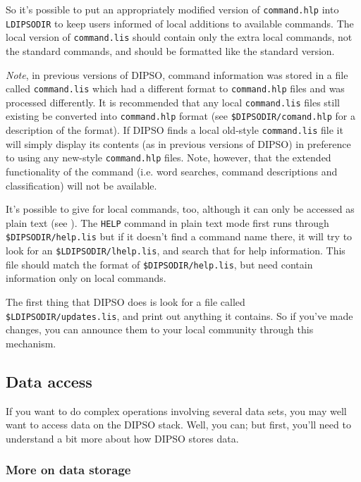 So it's possible to put an appropriately modified version of
{\tt{command.hlp}}  into {\tt{LDIPSODIR}}  to keep users informed of local
additions to available commands. The local version of {\tt{command.lis}} 
should contain only the extra local commands, not the standard commands,
and should be formatted like the standard version.

{\em Note}, in previous versions of DIPSO, command information was stored
in a file called {\tt{command.lis}}  which had a different format to
{\tt{command.hlp}}  files and was processed differently. It is recommended that
any local {\tt{command.lis}}  files still existing be converted into
{\tt{command.hlp}}  format (see {\tt{\$DIPSODIR/comand\-.hlp}}  for a description
of the format). If DIPSO finds a local old-style {\tt{command.lis}}  file
it will simply display its contents (as in previous versions of DIPSO) in
preference to using any new-style {\tt{command.hlp}}  files. Note, however,
that the extended functionality of the  
command (i.e. word searches, command descriptions and classification) will not be available.

It's possible to give  for local commands,
too, although it can only be accessed as plain text (see
). The {\tt{HELP}} command in plain
text mode first
runs through {\tt{\$DIPSO\-DIR/help\-.lis}}  but if it doesn't find a
command name there, it will try to look for an {\tt{\$LDIPSODIR/lhelp.lis}}, 
and search that for help information. This file should match the format
of {\tt{\$DIPSODIR/help.lis}},  but need contain information only on local
commands.

The first thing that DIPSO does is look for a file called
{\tt{\$LDIPSODIR/updates.lis}},  and print out anything it contains. So if
you've made changes, you can announce them to your local community
through this mechanism.

\subsection {Data access}

If you want to do complex operations involving several data sets, you
may well want to access data on the DIPSO stack. Well, you can; but
first, you'll need to understand a bit more about how DIPSO stores
data.

\subsubsection {\label{SEC:WRNDF}More on data storage}


